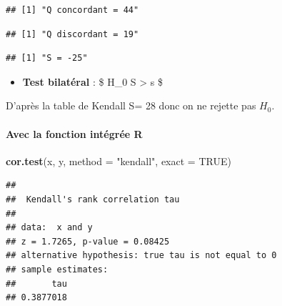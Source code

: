 \documentclass[
  12pt,
]{article}
\newenvironment{Shaded}{\begin{snugshade}}{\end{snugshade}}
\newcommand{\AttributeTok}[1]{\textcolor[rgb]{0.13,0.29,0.53}{#1}}
\newcommand{\ConstantTok}[1]{\textcolor[rgb]{0.56,0.35,0.01}{#1}}
\newcommand{\FunctionTok}[1]{\textcolor[rgb]{0.13,0.29,0.53}{\textbf{#1}}}
\newcommand{\NormalTok}[1]{#1}
\newcommand{\SpecialCharTok}[1]{\textcolor[rgb]{0.81,0.36,0.00}{\textbf{#1}}}
\newcommand{\StringTok}[1]{\textcolor[rgb]{0.31,0.60,0.02}{#1}}
\providecommand{\tightlist}{%
  \setlength{\itemsep}{0pt}\setlength{\parskip}{0pt}}
\begin{document}
\begin{verbatim}
## [1] "Q concordant = 44"
\end{verbatim}

\begin{Shaded}
\end{Shaded}

\begin{verbatim}
## [1] "Q discordant = 19"
\end{verbatim}

\begin{Shaded}
\end{Shaded}

\begin{verbatim}
## [1] "S = -25"
\end{verbatim}

\begin{itemize}
\tightlist
\item
  \textbf{Test bilatéral} : \$ \quad H\_0
  \quad {} \textbar S\textbar{} \textgreater{} s \$
\end{itemize}

D'après la table de Kendall S= 28 donc on ne rejette pas \(H_0\).

\paragraph{Avec la fonction intégrée
R}\label{avec-la-fonction-intuxe9gruxe9e-r}

\begin{Shaded}
\begin{Highlighting}[]
\FunctionTok{cor.test}\NormalTok{(x, y, }\AttributeTok{method =} \StringTok{"kendall"}\NormalTok{, }\AttributeTok{exact =} \ConstantTok{TRUE}\NormalTok{)}
\end{Highlighting}
\end{Shaded}

\begin{verbatim}
## 
##  Kendall's rank correlation tau
## 
## data:  x and y
## z = 1.7265, p-value = 0.08425
## alternative hypothesis: true tau is not equal to 0
## sample estimates:
##       tau 
## 0.3877018
\end{verbatim}
\end{document}
